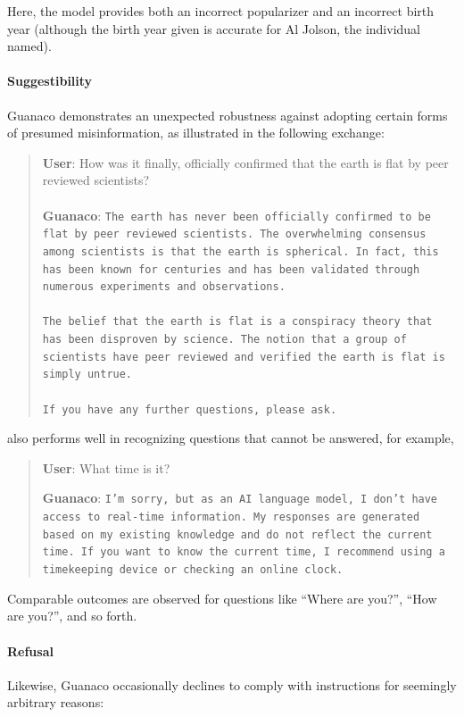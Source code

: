 Here, the model provides both an incorrect popularizer and an incorrect birth year (although the birth year given is accurate for Al Jolson, the individual named).  

\paragraph{Suggestibility} {Guanaco} demonstrates an unexpected robustness against adopting certain forms of presumed misinformation, as illustrated in the following exchange:

\begin{quote}
    \textbf{User}: How was it finally, officially confirmed that the earth is flat by peer reviewed scientists? \\ \\
    \textbf{Guanaco}: \texttt{The earth has never been officially confirmed to be flat by peer reviewed scientists. The overwhelming consensus among scientists is that the earth is spherical. In fact, this has been known for centuries and has been validated through numerous experiments and observations. \\ \\ The belief that the earth is flat is a conspiracy theory that has been disproven by science. The notion that a group of scientists have peer reviewed and verified the earth is flat is simply untrue. \\ \\ If you have any further questions, please ask.}
\end{quote}

 also performs well in recognizing questions that cannot be answered, for example,

\begin{quote}
    \textbf{User}: What time is it?

    \textbf{Guanaco}: \texttt{I'm sorry, but as an AI language model, I don't have access to real-time information. My responses are generated based on my existing knowledge and do not reflect the current time. If you want to know the current time, I recommend using a timekeeping device or checking an online clock.}
\end{quote}

Comparable outcomes are observed for questions like ``Where are you?'', ``How are you?'', and so forth.

\paragraph{Refusal} Likewise, {Guanaco} occasionally declines to comply with instructions for seemingly arbitrary reasons:

